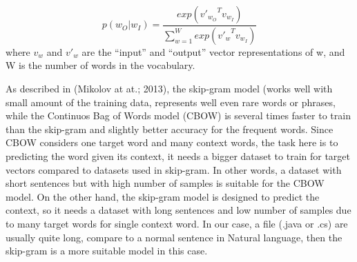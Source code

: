 \begin{displaymath}
p(w_{O}|w_{I}) = \frac{exp({{v'}_{w_{O}}}^{T}v_{w_{I}})}    {\sum_{w=1}^W exp({{v'}_{w}}^{T}v_{w_{I}})}
\end{displaymath}
where \begin{math}v_{w}\end{math} and \begin{math}{v'}_{w}\end{math} are the “input” and “output” vector representations of w, and W is the number of words in the vocabulary.

As described in (Mikolov at at.; 2013)\cite{mikolov2013distributed}, the skip-gram model (works well with small amount of the training data, represents well even rare words or phrases, while the Continuos Bag of Words model (CBOW) is several times faster to train than the skip-gram and slightly better accuracy for the frequent words. Since CBOW considers one target word and many context words, the task here is to predicting the word given its context, it needs a bigger dataset to train for target vectors compared to datasets used in skip-gram. In other words, a dataset with short sentences but with high number of samples is suitable for the CBOW model. On the other hand, the skip-gram model is designed to predict the context, so it needs a dataset with long sentences and low number of samples due to many target words for single context word. In our case, a file (.java or .cs) are usually quite long, compare to a normal sentence in Natural language, then the skip-gram is a more suitable model in this case. 


